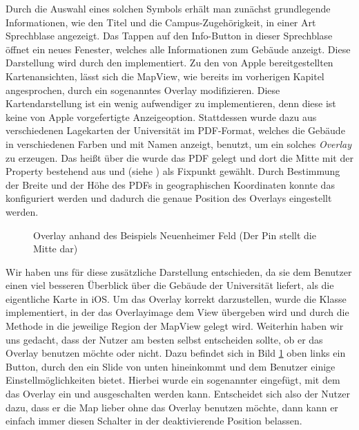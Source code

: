 \documentclass{report}
\begin{document}
Durch die Auswahl eines solchen Symbols erhält man zunächst grundlegende Informationen, wie den Titel und die Campus-Zugehörigkeit, in einer Art Sprechblase angezeigt. Das Tappen auf den Info-Button in dieser Sprechblase öffnet ein neues Fenester, welches alle Informationen zum Gebäude anzeigt. Diese Darstellung wird durch den  implementiert. Zu den von Apple bereitgestellten Kartenansichten, lässt sich die MapView, wie bereits im vorherigen Kapitel angesprochen, durch ein sogenanntes Overlay modifizieren. Diese Kartendarstellung ist ein wenig aufwendiger zu implementieren, denn diese ist keine von Apple vorgefertigte Anzeigeoption. Stattdessen wurde dazu aus verschiedenen Lagekarten der Universität im PDF-Format, welches die Gebäude in verschiedenen Farben und mit Namen anzeigt, benutzt, um ein solches \emph{Overlay} zu erzeugen. Das heißt über die  wurde das PDF gelegt und dort die Mitte mit der Property  bestehend aus  und  (siehe ) als Fixpunkt gewählt. Durch Bestimmung der Breite  und der Höhe  des PDFs in geographischen Koordinaten konnte das  konfiguriert werden und dadurch die genaue Position des Overlays eingestellt werden. 

\begin{figure}[ht]\label{bild_4}
\centering {}
\caption{Overlay anhand des Beispiels Neuenheimer Feld (Der Pin stellt die Mitte dar)}
\end{figure}

Wir haben uns für diese zusätzliche Darstellung entschieden, da sie dem Benutzer einen viel besseren Überblick über die Gebäude der Universität liefert, als die eigentliche Karte in iOS. Um das Overlay korrekt darzustellen, wurde die Klasse  implementiert, in der das Overlayimage dem View übergeben wird und durch die Methode  in die jeweilige Region der MapView gelegt wird. {\red Weiterhin haben wir uns gedacht, dass der Nutzer am besten selbst entscheiden sollte, ob er das Overlay benutzen möchte oder nicht. Dazu befindet sich in Bild \ref{bild_4} oben links ein Button, durch den ein Slide von unten hineinkommt und dem Benutzer einige Einstellmöglichkeiten bietet. Hierbei wurde ein sogenannter  eingefügt, mit dem das Overlay ein und ausgeschalten werden kann. Entscheidet sich also der Nutzer dazu, dass er die Map lieber ohne das Overlay benutzen möchte, dann kann er einfach immer diesen Schalter in der deaktivierende Position belassen. }
\end{document}
